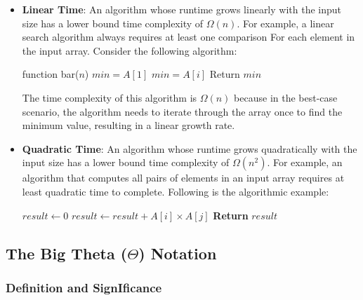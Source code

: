 \documentclass[12pt]{book} %
\begin{document}
\begin{itemize}
    \item \textbf{Linear Time}: An algorithm whose runtime grows linearly with the input size has a lower bound time complexity of $\Omega(n)$. For example, a linear search algorithm always requires at least one comparison For each element in the input array.
    \FloatBarrier
Consider the following algorithm:
\FloatBarrier
\begin{algorithm}[H]
\caption{Example Algorithm For Big Omega (\(\Omega\)) Notation}
\begin{algorithmic}
\State function bar($n$)
\State $min = A[1]$
\State $min = A[i]$
\EndIf
\EndFor
\State Return $min$
\end{algorithmic}
\end{algorithm}
\FloatBarrier
The time complexity of this algorithm is $\Omega(n)$ because in the best-case scenario, the algorithm needs to iterate through the array once to find the minimum value, resulting in a linear growth rate.
    
    \item \textbf{Quadratic Time}: An algorithm whose runtime grows quadratically with the input size has a lower bound time complexity of $\Omega(n^2)$. For example, an algorithm that computes all pairs of elements in an input array requires at least quadratic time to complete.
    \FloatBarrier
    Following is the algorithmic example:
    \FloatBarrier
    \begin{algorithm}
\caption{Quadratic Time Algorithm}
\begin{algorithmic}[1]
    \State $result \gets 0$
            \State $result \gets result + A[i] \times A[j]$
        \EndFor
    \EndFor
    \State \textbf{Return} $result$
\EndFunction
\end{algorithmic}
\end{algorithm}
\end{itemize}

\subsection{The Big Theta (\(\Theta\)) Notation}

\subsubsection{Definition and SignIficance}
\end{document}
